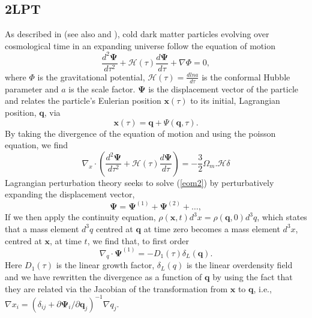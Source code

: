 \documentclass[5p,authoryear]{elsarticle}
\begin{document}
\subsection{2LPT}
As described in \cite{Scoccimarro1998} (see also \cite{Moutarde1991} and \cite{Bouchet1995}), cold dark matter particles evolving over cosmological time in an expanding universe follow the equation of motion
\begin{equation}
\frac{d^{2}\boldsymbol{\Psi}}{d\tau^{2}} + \mathcal{H}(\tau)\frac{d\boldsymbol{\Psi}}{d\tau} + \nabla \Phi = 0,
\label{eom}
\end{equation}
where $\Phi$ is the gravitational potential, $\mathcal{H}(\tau) = \frac{dlna}{d\tau}$ is the conformal Hubble parameter and $a$ is the scale factor. $\boldsymbol{\Psi}$ is the displacement vector of the particle and relates the particle's Eulerian position $\boldsymbol{x}(\tau)$ to its initial, Lagrangian position, $\boldsymbol{q}$, via
\begin{equation}
\boldsymbol{x}(\tau) = \boldsymbol{q} + \Psi(\boldsymbol{q},\tau).
\label{lagrangian}
\end{equation}
By taking the divergence of the equation of motion and using the poisson equation, we find
\begin{equation}
\nabla_{x} \cdot \left( \frac{d^{2}\boldsymbol{\Psi}}{d\tau^{2}} + \mathcal{H}(\tau)\frac{d\boldsymbol{\Psi}}{d\tau} \right) = - \frac{3}{2} \Omega_{m}. \mathcal{H} \delta
\label{eom2}
\end{equation}
Lagrangian perturbation theory seeks to solve (\ref{eom2}) by perturbatively expanding the displacement vector,
\begin{equation}
\boldsymbol{\Psi} = \boldsymbol{\Psi}^{(1)} + \boldsymbol{\Psi}^{(2)} + \ldots,
\end{equation}
If we then apply the continuity equation, $\rho(\boldsymbol{x},t)d^{3}x = \rho(\boldsymbol{q},0)d^{3}q$, which states that a mass element $d^{3}q$ centred at $\boldsymbol{q}$ at time zero becomes a mass element $d^{3}x$, centred at $\boldsymbol{x}$, at time $t$, we find that, to first order
\begin{equation}
\nabla_{q} \cdot \boldsymbol{\Psi}^{(1)} = -D_{1}(\tau) \delta_{L}(\boldsymbol{q}).
\label{za}
\end{equation}
Here $D_{1}(\tau)$ is the linear growth factor, $\delta_{L}(q)$ is the linear overdensity field and we have rewritten the divergence as a function of $\boldsymbol{q}$ by using the fact that they are related via the Jacobian of the transformation from $\boldsymbol{x}$ to $\boldsymbol{q}$, i.e., $\nabla x_{i} = (\delta_{ij} + \partial \boldsymbol{\Psi}_{i}/\partial \boldsymbol{q}_{j})^{-1} \nabla q_{j}$.
\end{document}
